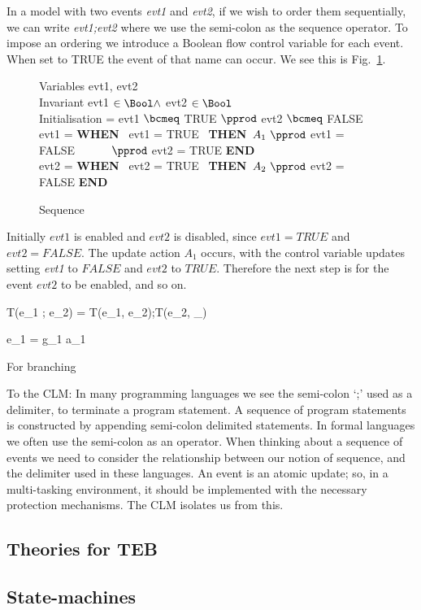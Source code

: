 In a model with two events \emph{evt1} and \emph{evt2}, if we wish to order them sequentially, we can write \emph{evt1;evt2} where we use the semi-colon as the sequence operator. To impose an ordering we introduce a Boolean flow control variable for each event. When set to TRUE the event of that name can occur. We see this is Fig.~\ref{fig:seq}. 
%
\begin{figure}
\centering
\begin{minipage}{0.7\textwidth}
Variables evt1, evt2\\
Invariant evt1 $\in \Bool \land$ evt2 $\in \Bool$  \\
Initialisation = evt1 $\bcmeq$ TRUE $\pprod$ evt2 $\bcmeq$ FALSE\\
evt1 = \textbf{WHEN}~ evt1 = TRUE~ \textbf{THEN}~$A_1~ \pprod$ evt1 = FALSE $\\
\hspace*{1.0cm} \pprod$ evt2 = TRUE \textbf{END}\\
evt2 = \textbf{WHEN}~ evt2 = TRUE~ \textbf{THEN}~$A_2~ \pprod$ evt2 = FALSE  \textbf{END}\\
\end{minipage}
\caption{Sequence}
\label{fig:seq}
\end{figure}
Initially $evt1$ is enabled and $evt2$ is disabled, since $evt1 = TRUE$ and $evt2 = FALSE$. The update action $A_1$ occurs, with the control variable updates setting \emph{evt1} to $FALSE$ and $evt2$ to $TRUE$. Therefore the next step is for the event $evt2$ to be enabled, and so on.

T(e_1 ; e_2) =
T(e_1, e_2);T(e_2, _)

e_1 = g_1 \rightarrow a_1



For branching


To the CLM:
In many programming languages we see the semi-colon `;' used as a delimiter, to terminate a program statement. A sequence of program statements is constructed by appending semi-colon delimited statements. In formal languages we often use the semi-colon as an operator. When thinking about a sequence of events we need to consider the relationship between our notion of sequence, and the delimiter used in these languages. An event is an atomic update; so, in a multi-tasking environment, it should be implemented with the necessary protection mechanisms. The CLM isolates us from this.   



\subsection{Theories for TEB}

\subsection{State-machines}